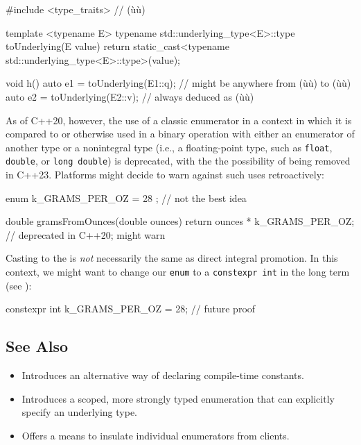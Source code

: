 \begin{emcppslisting}[emcppsbatch=e2]
#include <type_traits>  // (ù{}ù)

template <typename E>
typename std::underlying_type<E>::type toUnderlying(E value)
{
    return static_cast<typename std::underlying_type<E>::type>(value);
}

void h()
{
    auto e1 = toUnderlying(E1::q); // might be anywhere from (ù{}ù) to (ù{}ù)
    auto e2 = toUnderlying(E2::v); // always deduced as (ù{}ù)
}
\end{emcppslisting}

\noindent As of C++20, however, the use of a classic enumerator in a context in
which it is compared to or otherwise used in a binary operation with
either an enumerator of another type or a nonintegral type (i.e., a
floating-point type, such as \lstinline!float!, \lstinline!double!, or
\lstinline!long!~\lstinline!double!) is deprecated, with the the possibility
of being removed in C++23. Platforms might decide to warn against such
uses retroactively:

\begin{emcppslisting}
enum { k_GRAMS_PER_OZ = 28 };  // not the best idea

double gramsFromOunces(double ounces)
{
    return ounces * k_GRAMS_PER_OZ;  // deprecated in C++20; might warn
}
\end{emcppslisting}

\noindent Casting to the  is \emph{not} necessarily the
same as direct integral promotion. In this context, we might want to
change our \lstinline!enum! to a
\lstinline!constexpr!~\lstinline!int! in the long
term (see ): 

\begin{emcppslisting}
constexpr int k_GRAMS_PER_OZ = 28;  // future proof
\end{emcppslisting}


\subsection[See Also]{See Also}\label{see-also}

\begin{itemize}
\item{Introduces an alternative way of declaring compile-time constants.}
\item{Introduces a scoped, more strongly typed enumeration that can explicitly specify an underlying type.}
\item{Offers a means to insulate individual enumerators from clients.}
\end{itemize}

